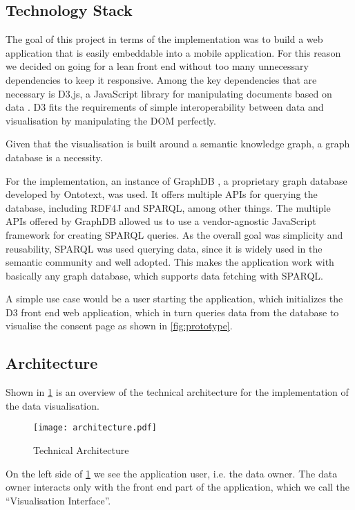 \documentclass[../paper.tex]{subfiles}
\begin{document}
  \subsection{Technology Stack}

  The goal of this project in terms of the implementation was to
  build a web application that is easily embeddable into a mobile application.
  For this reason we decided on going for a lean front end without too many
  unnecessary dependencies to keep it responsive. Among the key dependencies that
  are necessary is D3.js, a JavaScript library for manipulating documents based
  on data \cite{d3}. D3 fits the requirements of simple interoperability between
  data and visualisation by manipulating the DOM perfectly.

  Given that the
  visualisation is built around a semantic knowledge graph, a graph database is
  a necessity.

  For the implementation, an instance of  GraphDB \cite{graphdb}, a proprietary graph
  database developed by Ontotext, was used. It offers multiple APIs for querying the database,
  including RDF4J and SPARQL, among other things. The multiple APIs offered by
  GraphDB allowed us to use a vendor-agnostic JavaScript framework for
  creating SPARQL queries. As the overall goal was simplicity and reusability,
  SPARQL was used querying data, since it is widely used
  in the semantic community and well adopted. This makes the application work with
  basically any graph database, which supports data fetching with SPARQL.

  A simple use case would be a user starting the application, which initializes
  the D3 front end web application, which in turn queries data from the database
  to visualise the consent page as shown in \cref{fig:prototype}.

  \subsection{Architecture}

  Shown in \cref{fig:architecture} is an overview of the technical architecture
  for the implementation of the data visualisation.

  \begin{figure}
    \centering
    \texttt{[image: architecture.pdf]}
    \caption{Technical Architecture}
    \label{fig:architecture}
  \end{figure}

  On the left side of \cref{fig:architecture} we see the application user, i.e.
  the data owner. The data owner interacts only with the front end part of the
  application, which we call the “Visualisation Interface”.
\end{document}
